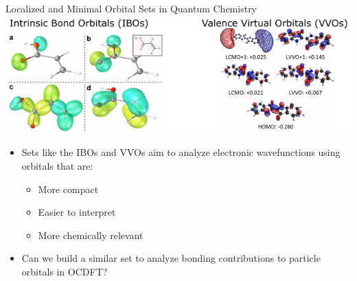 \documentclass[t]{beamer}
\newcommand\blfootnote[1]{%
  \begingroup
  \renewcommand\thefootnote{}\footnote{#1}%
  \addtocounter{footnote}{-1}%
  \endgroup
}
\begin{document}
\begin{frame}{Localized and Minimal Orbital Sets in Quantum Chemistry}
\centering
\includegraphics[width=\linewidth]{iao_vvo.pdf}
\begin{itemize}
\item Sets like the IBOs\footnotemark {} and VVOs\footnotemark {} aim to analyze electronic wavefunctions using orbitals that are:
		\begin{itemize}
		\item More compact
		\item Easier to interpret
		\item More chemically relevant
		\end{itemize}
\item Can we build a similar set to analyze bonding contributions to particle orbitals in OCDFT?
\end{itemize}
\end{frame}

\end{document}

